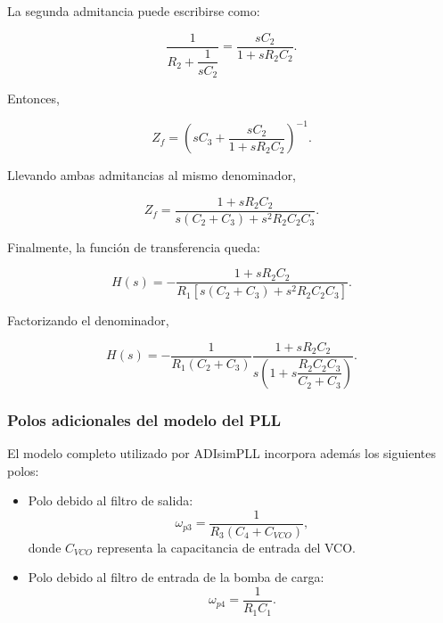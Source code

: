 La segunda admitancia puede escribirse como:

\begin{equation}
\frac{1}{R_2 + \dfrac{1}{sC_2}} = \frac{sC_2}{1 + sR_2C_2}.
\end{equation}

Entonces,

\begin{equation}
Z_f = \left(sC_3 + \frac{sC_2}{1 + sR_2C_2}\right)^{-1}.
\end{equation}

Llevando ambas admitancias al mismo denominador,

\begin{equation}
Z_f = \frac{1 + sR_2C_2}{s(C_2 + C_3) + s^2R_2C_2C_3}.
\end{equation}

Finalmente, la función de transferencia queda:

\begin{equation}
H(s) = -\frac{1 + sR_2C_2}{R_1\left[s(C_2 + C_3) + s^2R_2C_2C_3\right]}.
\end{equation}

Factorizando el denominador,

\begin{equation}
H(s) = -\frac{1}{R_1(C_2 + C_3)} \frac{1 + sR_2C_2}{s\left(1 + s\dfrac{R_2C_2C_3}{C_2 + C_3}\right)}.
\end{equation}

\subsubsection{Polos adicionales del modelo del PLL}

El modelo completo utilizado por ADIsimPLL incorpora además los siguientes polos:

\begin{itemize}
\item Polo debido al filtro de salida:
\begin{equation}
\omega_{p3} = \frac{1}{R_3(C_4 + C_{VCO})},
\end{equation}
donde $C_{VCO}$ representa la capacitancia de entrada del VCO.

\item Polo debido al filtro de entrada de la bomba de carga:
\begin{equation}
\omega_{p4} = \frac{1}{R_1C_1}.
\end{equation}
\end{itemize}

